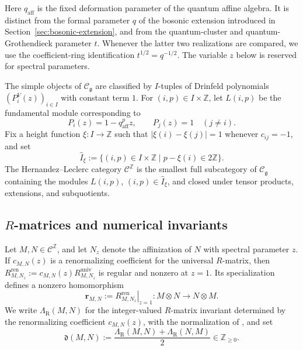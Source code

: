 \documentclass[12pt, reqno]{amsart}
\theoremstyle{plain}
\theoremstyle{definition}
\numberwithin{equation}{section}
\newcommand{\ZZ}{\mathbb{Z}}
\newcommand{\fg}{\operatorname{\mathfrak{g}}}
\newcommand{\LambdaR}{\Lambda_{\mathrm R}}
\begin{document}
Here \(q_{\mathrm{aff}}\) is the fixed deformation parameter of the
quantum affine algebra. It is distinct from the formal parameter \(q\)
of the bosonic extension introduced in
Section~\ref{sec:bosonic-extension}, and from the quantum-cluster and
quantum-Grothendieck parameter \(t\). Whenever the latter two
realizations are compared, we use the coefficient-ring identification
\(t^{1/2}=q^{-1/2}\). The variable \(z\) below is reserved for spectral
parameters.

The simple objects of \(\mathscr C_{\fg}\) are classified by \(I\)-tuples
of Drinfeld polynomials \((P_i^V(z))_{i\in I}\) with constant term \(1\).
For \((i,p)\in I\times\ZZ\), let \(L(i,p)\) be the fundamental module
corresponding to
\begin{equation}\label{eq:fundamental-Drinfeld-polynomial}
    P_i(z)=1-q_{\mathrm{aff}}^p z,
    \qquad
    P_j(z)=1 \quad (j\neq i).
\end{equation}
Fix a height function \(\xi\colon I\to\ZZ\) such that
\(\lvert\xi(i)-\xi(j)\rvert=1\) whenever \(c_{ij}=-1\), and set
\begin{equation}\label{eq:I-hat-xi}
    \widehat I_\xi
    :=\{(i,p)\in I\times\ZZ\mid p-\xi(i)\in2\ZZ\}.
\end{equation}
The Hernandez--Leclerc category \(\mathscr C^{\ZZ}\) is the smallest full
subcategory of \(\mathscr C_{\fg}\) containing the modules \(L(i,p)\),
\((i,p)\in\widehat I_\xi\), and closed under tensor products, extensions,
and subquotients.

\subsection{\texorpdfstring{\(R\)-matrices and numerical invariants}
{R-matrices and numerical invariants}}

Let \(M,N\in\mathscr C^{\ZZ}\), and let \(N_z\) denote the affinization of
\(N\) with spectral parameter \(z\). If \(c_{M,N}(z)\) is a renormalizing
coefficient for the universal \(R\)-matrix, then
\(R^{\mathrm{ren}}_{M,N_z}
:=c_{M,N}(z)R^{\mathrm{univ}}_{M,N_z}\) is regular and nonzero at
\(z=1\). Its specialization defines a nonzero homomorphism
\begin{equation}\label{eq:renormalized-R-matrix}
    \mathbf r_{M,N}
    :=\left.R^{\mathrm{ren}}_{M,N_z}\right|_{z=1}
    \colon M\otimes N\longrightarrow N\otimes M.
\end{equation}
We write \(\LambdaR(M,N)\) for the integer-valued \(R\)-matrix invariant
determined by the renormalizing coefficient \(c_{M,N}(z)\), with the
normalization of \cite{kashiwara2020monoidal}, and set
\begin{equation}\label{eq:d-invariant}
    \mathfrak d(M,N)
    :=\frac{\LambdaR(M,N)+\LambdaR(N,M)}{2}
    \in\ZZ_{\geq0}.
\end{equation}
\end{document}
